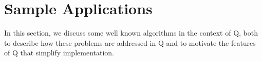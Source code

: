 \section{Sample Applications}
\label{sample_apps}

In this section, we discuss some well known algorithms in the context of Q, both
to describe how these problems are addressed in Q and to motivate the features
of Q that simplify implementation.


